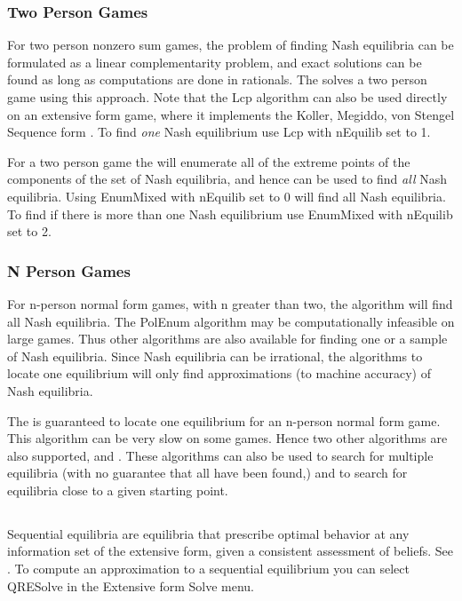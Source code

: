 \subsubsection{Two Person Games}\label{twopersec}
For two person nonzero sum games, the problem of finding Nash
equilibria can be formulated as a linear complementarity problem, and
exact solutions can be found as long as computations are done in
rationals.  The  solves a two person game
using this approach.  Note that the Lcp algorithm can also be used
directly on an extensive form game, where it implements the Koller,
Megiddo, von Stengel Sequence form \cite{KolMegSte:94}.  To find {\em 
one} Nash equilibrium use Lcp with nEquilib set to 1.

For a two person game the  
will enumerate all of the extreme points of the components of the set
of Nash equilibria, and hence can be used to find {\em all} Nash
equilibria.  Using EnumMixed with nEquilib set to 0 will find all Nash
equilibria.  To find if there is more than one Nash equilibrium use
EnumMixed with nEquilib set to 2.

\subsubsection{N Person Games}\label{npernashsec}
For n-person normal form games, with n greater than two, the
 algorithm will find all Nash
equilibria. The PolEnum algorithm may be computationally infeasible on
large games.  Thus other algorithms are also available for finding one
or a sample of Nash equilibria.  Since Nash equilibria can be
irrational, the algorithms to locate one equilibrium will only find
approximations (to machine accuracy) of Nash equilibria.

The  is guaranteed to locate one
equilibrium for an n-person normal form game.  This algorithm can be
very slow on some games.  Hence two other algorithms are also
supported,  and .  These
algorithms can also be used to search for multiple equilibria (with no
guarantee that all have been found,) and to search for equilibria
close to a given starting point.

\subsection{}\label{seqnashsec}
Sequential equilibria are equilibria that prescribe optimal behavior
at any information set of the extensive form, given a consistent
assessment of beliefs.  See \cite{KrepsWilson:1982}.  To compute an
approximation to a sequential equilibrium you can select QRESolve in
the Extensive form Solve menu.

